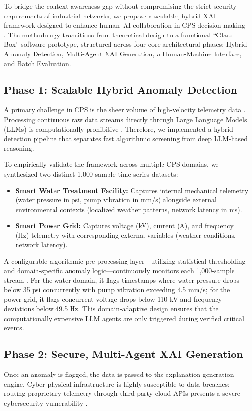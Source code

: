 \documentclass[a4paper,fleqn]{cas-dc}
\begin{document}
To bridge the context-awareness gap without compromising the strict security requirements of industrial networks, we propose a scalable, hybrid XAI framework designed to enhance human--AI collaboration in CPS decision-making \cite{ref_humanai}. The methodology transitions from theoretical design to a functional ``Glass Box'' software prototype, structured across four core architectural phases: Hybrid Anomaly Detection, Multi-Agent XAI Generation, a Human-Machine Interface, and Batch Evaluation.

\subsection{Phase 1: Scalable Hybrid Anomaly Detection}
A primary challenge in CPS is the sheer volume of high-velocity telemetry data \cite{ref4}. Processing continuous raw data streams directly through Large Language Models (LLMs) is computationally prohibitive \cite{ref_llama}. Therefore, we implemented a hybrid detection pipeline that separates fast algorithmic screening from deep LLM-based reasoning. 

To empirically validate the framework across multiple CPS domains, we synthesized two distinct 1,000-sample time-series datasets:
\begin{itemize}
    \item \textbf{Smart Water Treatment Facility:} Captures internal mechanical telemetry (water pressure in psi, pump vibration in mm/s) alongside external environmental contexts (localized weather patterns, network latency in ms).
    \item \textbf{Smart Power Grid:} Captures voltage (kV), current (A), and frequency (Hz) telemetry with corresponding external variables (weather conditions, network latency).
\end{itemize}

A configurable algorithmic pre-processing layer---utilizing statistical thresholding and domain-specific anomaly logic---continuously monitors each 1,000-sample stream \cite{ref1, ref63}. For the water domain, it flags timestamps where water pressure drops below 35 psi concurrently with pump vibration exceeding 4.5 mm/s; for the power grid, it flags concurrent voltage drops below 110 kV and frequency deviations below 49.5 Hz. This domain-adaptive design ensures that the computationally expensive LLM agents are only triggered during verified critical events.

\subsection{Phase 2: Secure, Multi-Agent XAI Generation}
Once an anomaly is flagged, the data is passed to the explanation generation engine. Cyber-physical infrastructure is highly susceptible to data breaches; routing proprietary telemetry through third-party cloud APIs presents a severe cybersecurity vulnerability \cite{ref10}. 
\end{document}
